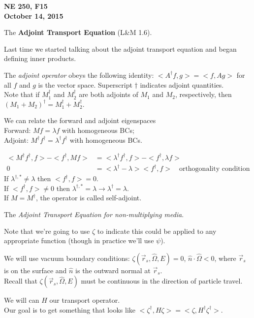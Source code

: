\documentclass[12pt]{article}
\newcommand{\vOmega}{\ensuremath{\hat{\Omega}}}
\begin{document}
\begin{center}
{\bf NE 250, F15\\
October 14, 2015 
}
\end{center}

The \textbf{Adjoint Transport Equation} (L\&M 1.6).

Last time we started talking about the adjoint transport equation and began defining inner products. 

The \textit{adjoint operator} obeys the following identity: $<A^{\dagger}f, g> = <f, Ag>$ for all $f$ and $g$ is the vector space. Superscript $\dagger$ indicates adjoint quantities.\\
Note that if $M_1^{\dagger}$ and $M_2^{\dagger}$ are both adjoints of $M_1$ and $M_2$, respectively, then $(M_1 + M_2)^{\dagger}  = M_1^{\dagger} + M_2^{\dagger}$.

We can relate the forward and adjoint eigenspaces\\
Forward: $Mf = \lambda f$ with homogeneous BCs;\\
Adjoint: $M^{\dagger}f^{\dagger} = \lambda^{\dagger} f^{\dagger}$ with homogeneous BCs.

\begin{align*}
<M^{\dagger}f^{\dagger}, f> - <f^{\dagger}, Mf> &= <\lambda^{\dagger} f^{\dagger}, f> - <f^{\dagger} ,\lambda f> \\
0 &= <\lambda^{\dagger} - \lambda> <f^{\dagger}, f> \quad \text{orthogonality condition}
\end{align*}
%
If $\lambda^{\dagger, *} \neq \lambda$ then $<f^{\dagger}, f> = 0$.\\
If $<f^{\dagger}, f> \neq 0$ then $\lambda^{\dagger, *} = \lambda \rightarrow \lambda^{\dagger} = \lambda$.\\
If $M = M^{\dagger}$, the operator is called self-adjoint. 

The \textit{Adjoint Transport Equation for non-multiplying media}.

Note that we're going to use $\zeta$ to indicate this could be applied to any appropriate function (though in practice we'll use $\psi$).

We will use vacuum boundary conditions: $\zeta(\vec{r}_s, \vOmega, E) = 0$, $\hat{n} \cdot \vOmega < 0$, where $\vec{r}_s$ is on the surface and $\hat{n}$ is the outward normal at $\vec{r}_s$.\\
Recall that $\zeta(\vec{r}_s, \vOmega, E)$ must be continuous in the direction of particle travel.


We will can $H$ our transport operator.\\
Our goal is to get something that looks like $<\zeta^{\dagger}, H \zeta> = <\zeta, H^{\dagger} \zeta^{\dagger}>$.\\
\end{document}

